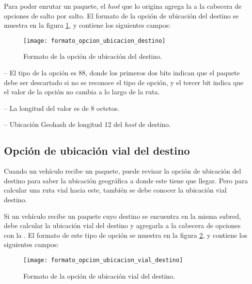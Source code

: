 Para poder enrutar un paquete, el \textit{host} que lo origina agrega la
 a la cabecera de opciones de salto
por salto. El formato de la opción de ubicación del destino se muestra en la
figura \ref{fig:formato_opcion_ubicacion_destino}, y contiene los siguientes
campos:

\begin{figure}[th!]
\centering
\texttt{[image: formato\_opcion\_ubicacion\_destino]}
\decoRule
\caption[Formato de la opción de ubicación del destino]{Formato de la opción de
ubicación del destino.}
\label{fig:formato_opcion_ubicacion_destino}
\end{figure}

 -- El tipo de la opción es 88, donde los primeros dos
bits indican que el paquete debe ser descartado si no se reconoce el tipo de
opción, y el tercer bit indica que el valor de la opción no cambia a lo largo
de la ruta.

 -- La longitud del valor es de 8 octetos.

 -- Ubicación Geohash de longitud 12 del
\textit{host} de destino.

\subsection{Opción de ubicación vial del destino}
\label{subsec:opcion_de_ubicacion_vial_del_destino}

Cuando un vehículo recibe un paquete, puede revisar la opción de ubicación del
destino para saber la ubicación geográfica a donde este tiene que llegar. Pero
para calcular una ruta vial hacia este, también se debe conocer la ubicación
vial destino.

Si un vehículo recibe un paquete cuyo destino se encuentra en la misma subred,
debe calcular la ubicación vial del destino y agregarla a la cabecera de
opciones con la . El formato de
este tipo de opción se muestra en la figura
\ref{fig:formato_opcion_ubicacion_vial_destino}, y contiene los siguientes
campos:

\begin{figure}[th!]
\centering
\texttt{[image: formato\_opcion\_ubicacion\_vial\_destino]}
\decoRule
\caption[Formato de la opción de ubicación vial del destino]{Formato de la
opción de ubicación vial del destino.}
\label{fig:formato_opcion_ubicacion_vial_destino}
\end{figure}

